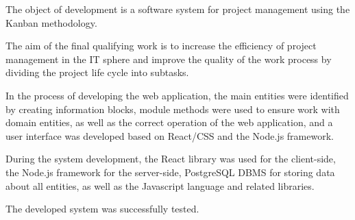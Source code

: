 The object of development is a software system for project management using the Kanban methodology.

The aim of the final qualifying work is to increase the efficiency of project management in the IT sphere and improve the quality of the work process by dividing the project life cycle into subtasks.

In the process of developing the web application, the main entities were identified by creating information blocks, module methods were used to ensure work with domain entities, as well as the correct operation of the web application, and a user interface was developed based on React/CSS and the Node.js framework.

During the system development, the React library was used for the client-side, the Node.js framework for the server-side, PostgreSQL DBMS for storing data about all entities, as well as the Javascript language and related libraries.

The developed system was successfully tested.
